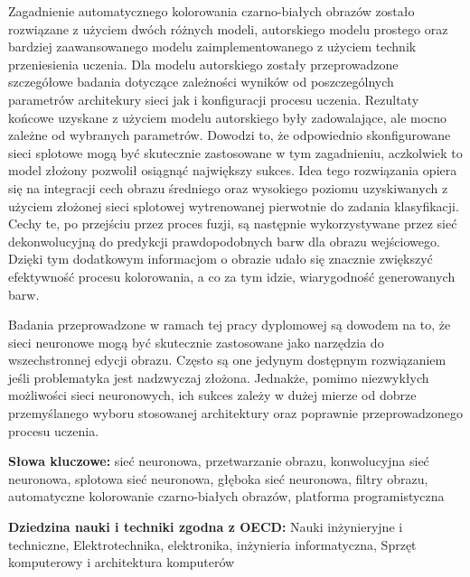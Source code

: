   Zagadnienie automatycznego kolorowania czarno-białych
  obrazów zostało rozwiązane z użyciem dwóch różnych modeli, autorskiego modelu
  prostego oraz bardziej zaawansowanego modelu zaimplementowanego z użyciem technik
  przeniesienia uczenia. Dla modelu autorskiego zostały przeprowadzone szczegółowe
  badania dotyczące zależności wyników od poszczególnych parametrów architekury
  sieci jak i konfiguracji procesu uczenia. Rezultaty końcowe uzyskane z użyciem
  modelu autorskiego były zadowalające, ale mocno zależne od wybranych parametrów.
  Dowodzi to, że odpowiednio skonfigurowane sieci splotowe mogą być skutecznie
  zastosowane w tym zagadnieniu, aczkolwiek to model złożony pozwolił osiągnąć
  największy sukces.
  Idea tego rozwiązania opiera się na integracji cech obrazu średniego oraz wysokiego
  poziomu uzyskiwanych z użyciem złożonej sieci splotowej wytrenowanej pierwotnie do
  zadania klasyfikacji. Cechy te, po przejściu przez proces fuzji, są następnie
  wykorzystywane przez sieć dekonwolucyjną do predykcji prawdopodobnych barw dla
  obrazu wejściowego. Dzięki tym dodatkowym informacjom o obrazie udało się
  znacznie zwiększyć efektywność procesu kolorowania, a co za tym idzie,
  wiarygodność generowanych barw.

  Badania przeprowadzone w ramach tej pracy dyplomowej są dowodem na to, że
  sieci neuronowe mogą być skutecznie zastosowane jako narzędzia do wszechstronnej
  edycji obrazu. Często są one jedynym dostępnym rozwiązaniem jeśli problematyka
  jest nadzwyczaj złożona. Jednakże, pomimo niezwykłych możliwości sieci
  neuronowych, ich sukces zależy w dużej mierze od dobrze przemyślanego
  wyboru stosowanej architektury oraz poprawnie przeprowadzonego
  procesu uczenia.

  \bigskip

  \noindent\textbf{Słowa kluczowe:} sieć neuronowa, przetwarzanie obrazu,
  konwolucyjna sieć neuronowa, splotowa sieć neuronowa,
  głęboka sieć neuronowa, filtry obrazu, automatyczne kolorowanie czarno-białych
  obrazów, platforma programistyczna

  \bigskip

  \noindent\textbf{Dziedzina nauki i techniki zgodna z OECD:} Nauki
  inżynieryjne i techniczne, Elektrotechnika, elektronika, inżynieria
  informatyczna, Sprzęt komputerowy i architektura komputerów
